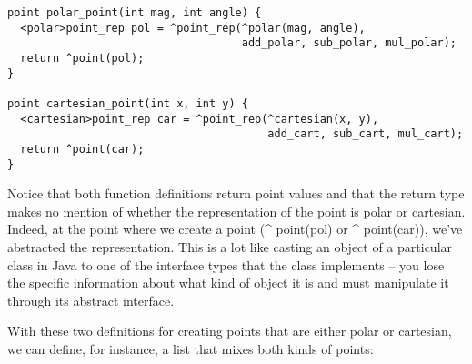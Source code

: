 \documentclass[titlepage,10pt]{article}
\begin{document}

\begin{verbatim}
point polar_point(int mag, int angle) {
  <polar>point_rep pol = ^point_rep(^polar(mag, angle),
                                    add_polar, sub_polar, mul_polar);
  return ^point(pol); 
}

point cartesian_point(int x, int y) {
  <cartesian>point_rep car = ^point_rep(^cartesian(x, y),
                                        add_cart, sub_cart, mul_cart);
  return ^point(car);
}
\end{verbatim}

Notice that both function definitions return point values and that the
return type makes no mention of whether the representation of the point
is polar or cartesian.  Indeed, at the point where we create a point
(\^{} point(pol) or \^{} point(car)), we've abstracted the representation.
This is a lot like casting an object of a particular class in Java to
one of the interface types that the class implements -- you lose the
specific information about what kind of object it is and must manipulate
it through its abstract interface.

With these two definitions for creating points that are either polar or
cartesian, we can define, for instance, a list that mixes both kinds of
points:
\end{document}
